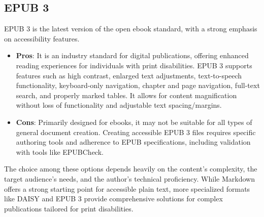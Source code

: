 \subsection{EPUB 3}
EPUB 3 is the latest version of the open ebook standard, with a strong emphasis on accessibility features.\cite{ElsevierEPUB3}\cite{CNIBEPUB}
\begin{itemize}
    \item \textbf{Pros}: It is an industry standard for digital publications, offering enhanced reading experiences for individuals with print disabilities.\cite{ElsevierEPUB3} EPUB 3 supports features such as high contrast, enlarged text adjustments, text-to-speech functionality, keyboard-only navigation, chapter and page navigation, full-text search, and properly marked tables.\cite{ElsevierEPUB3} It allows for content magnification without loss of functionality and adjustable text spacing/margins.\cite{ElsevierEPUB3}
    \item \textbf{Cons}: Primarily designed for ebooks, it may not be suitable for all types of general document creation. Creating accessible EPUB 3 files requires specific authoring tools and adherence to EPUB specifications, including validation with tools like EPUBCheck.\cite{CNIBEPUB}
\end{itemize}
The choice among these options depends heavily on the content's complexity, the target audience's needs, and the author's technical proficiency. While Markdown offers a strong starting point for accessible plain text, more specialized formats like DAISY and EPUB 3 provide comprehensive solutions for complex publications tailored for print disabilities.

